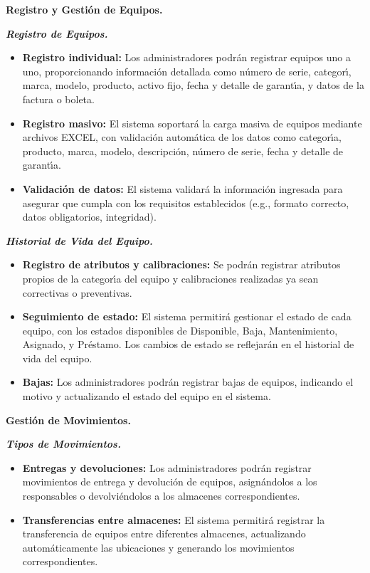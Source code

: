 \documentclass[stu, 12pt, letterpaper, donotrepeattitle, floatsintext, natbib]{apa7}
\begin{document}
\textbf{Registro y Gesti\'on de Equipos.}

\textit{\textbf{Registro de Equipos.}}
\begin{itemize}
    \item\textbf{Registro individual: }Los administradores podr\'an registrar equipos uno a uno, proporcionando informaci\'on detallada como n\'umero de serie, categor\'{\i}, marca, modelo, producto, activo fijo, fecha y detalle de
          garant\'{\i}a, y datos de la factura o boleta.
    \item\textbf{Registro masivo: }El sistema soportar\'a la carga masiva de equipos mediante archivos EXCEL, con validaci\'on autom\'atica de los datos como categor\'{\i}a, producto, marca, modelo, descripci\'on, n\'umero de serie,
          fecha y detalle de garant\'{\i}a.
    \item\textbf{Validaci\'on de datos: }El sistema validar\'a la informaci\'on ingresada para asegurar que cumpla con los requisitos establecidos (e.g., formato correcto, datos obligatorios, integridad).
\end{itemize}

\textit{\textbf{Historial de Vida del Equipo.}}
\begin{itemize}
    \item\textbf{Registro de atributos y calibraciones: }Se podr\'an registrar atributos propios de la categor\'{\i}a del equipo y calibraciones realizadas ya sean correctivas o preventivas.
    \item\textbf{Seguimiento de estado: }El sistema permitir\'a gestionar el estado de cada equipo, con los estados disponibles de Disponible, Baja, Mantenimiento, Asignado, y Pr\'estamo. Los cambios de estado se
          reflejar\'an en el historial de vida del equipo.
    \item\textbf{Bajas: }Los administradores podr\'an registrar bajas de equipos, indicando el motivo y actualizando el estado del equipo en el sistema.
\end{itemize}

\textbf{Gesti\'on de Movimientos.}

\textit{\textbf{Tipos de Movimientos.}}
\begin{itemize}
    \item\textbf{Entregas y devoluciones: }Los administradores podr\'an registrar movimientos de entrega y devoluci\'on de equipos, asign\'andolos a los responsables o devolvi\'endolos a los almacenes correspondientes.
    \item\textbf{Transferencias entre almacenes: }El sistema permitir\'a registrar la transferencia de equipos entre diferentes almacenes, actualizando autom\'aticamente las ubicaciones y generando los movimientos correspondientes.
\end{itemize}
\end{document}
